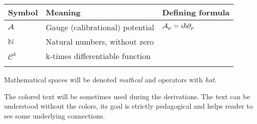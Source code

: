 

\begin{tabular} {@{}C{1.9cm}@{}p{8cm}@{}C{3.77cm}}
	\toprule
	\textbf{Symbol}& \textbf{Meaning}& \textbf{Defining formula}\\\bottomrule
	$\mathcal{A}$ & Gauge (calibrational) potential & $\mathcal{A}_\mu=i\hbar \partial_\mu$ \\
	$\mathbb{N}$ & Natural numbers, without zero \\
	$\mathcal{C}^k$ & k-times differentiable function \\
	
\bottomrule
{}
\end{tabular}

Mathematical spaces will be denoted \emph{mathcal} and operators with \emph{hat}.

The colored text will be sometimes used during the derivations. The text can be understood without the colors, its goal is strictly pedagogical and helps reader to see some underlying connections.